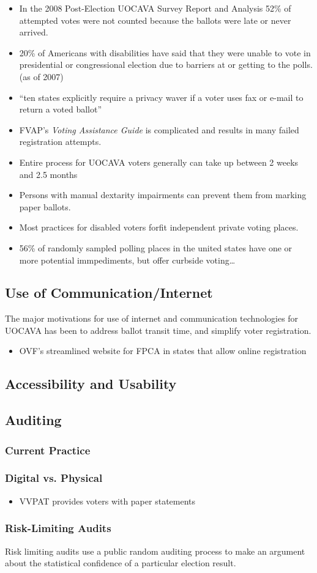 \begin{itemize}
\item In the 2008 Post-Election UOCAVA Survey Report and Analysis 52\% of attempted votes were not counted because the ballots were late or never arrived.
\item 20\% of Americans with disabilities have said that they were unable to vote in presidential or congressional election due to barriers at or getting to the polls. (as of 2007)
\item ``ten states explicitly require a privacy waver if a voter uses fax or e-mail to return a voted ballot''
\item FVAP's {\em Voting Assistance Guide} is complicated and results in many failed registration attempts.
\item Entire process for UOCAVA voters generally can take up between 2 weeks and 2.5 months
\item Persons with manual dextarity impairments can prevent them from marking paper ballots.
\item Most practices for disabled voters forfit independent private voting places.
\item 56\% of randomly sampled polling places in the united states have one or more potential immpediments, but offer curbside voting\ldots
\end{itemize}

\subsection{Use of Communication/Internet}

The major motivations for use of internet and communication technologies for UOCAVA has been to address ballot transit time, and simplify voter registration. 
\begin{itemize}
\item OVF's streamlined website for FPCA in states that allow online registration
\end{itemize}

\subsection{Accessibility and Usability}
\subsection{Auditing}
\subsubsection{Current Practice}
\subsubsection{Digital vs. Physical}
\begin{itemize}
\item VVPAT provides voters with paper statements
\end{itemize}
\subsubsection{Risk-Limiting Audits}
Risk limiting audits use a public random auditing process to make an argument about the statistical confidence of a particular election result.
